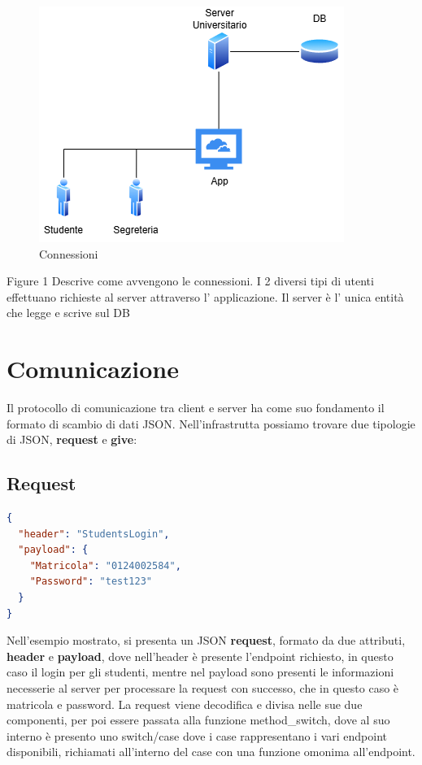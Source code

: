 \documentclass{article}
\begin{document}
\begin{figure}
    \includegraphics[width=1\linewidth]{IMG/Actors.drawio.png}
    \caption{Connessioni}
    \label{fig:wrapfig}
\end{figure}

Figure 1 Descrive come avvengono le connessioni.
I 2 diversi tipi di utenti effettuano richieste al server attraverso l' applicazione.
Il server è l' unica entità che legge e scrive sul DB

\newpage
\section{Comunicazione}
Il protocollo di comunicazione tra client e server ha come suo fondamento il formato di scambio di dati JSON. Nell'infrastrutta possiamo trovare due tipologie di JSON, \textbf{request} e \textbf{give}:
\subsection{Request}
\begin{lstlisting}[language=json,firstnumber=1]
{
  "header": "StudentsLogin",
  "payload": {
    "Matricola": "0124002584",
    "Password": "test123"
  }
}
\end{lstlisting}
Nell'esempio mostrato, si presenta un JSON \textbf{request}, formato da due attributi, \textbf{header} e \textbf{payload}, dove nell'header è presente l'endpoint richiesto, in questo caso il login per gli studenti, mentre nel payload sono presenti le informazioni necesserie al server per processare la request con successo, che in questo caso è matricola e password.
La request viene decodifica e divisa nelle sue due componenti, per poi essere passata alla funzione method\_switch, dove al suo interno è presento uno switch/case dove i case rappresentano i vari endpoint disponibili, richiamati all'interno del case con una funzione omonima all'endpoint.
\end{document}
